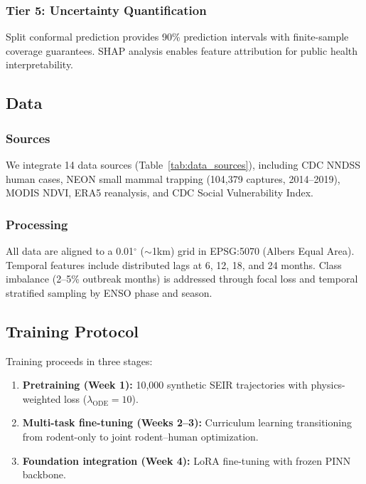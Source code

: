 \documentclass[11pt,a4paper]{article}
\begin{document}
\subsubsection{Tier 5: Uncertainty Quantification}

Split conformal prediction provides 90\% prediction intervals with finite-sample coverage guarantees. SHAP analysis enables feature attribution for public health interpretability.

\subsection{Data}

\subsubsection{Sources}

We integrate 14 data sources (Table~\ref{tab:data_sources}), including CDC NNDSS human cases, NEON small mammal trapping (104,379 captures, 2014--2019), MODIS NDVI, ERA5 reanalysis, and CDC Social Vulnerability Index.

\subsubsection{Processing}

All data are aligned to a 0.01$^\circ$ ($\sim$1km) grid in EPSG:5070 (Albers Equal Area). Temporal features include distributed lags at 6, 12, 18, and 24 months. Class imbalance (2--5\% outbreak months) is addressed through focal loss and temporal stratified sampling by ENSO phase and season.

\subsection{Training Protocol}

Training proceeds in three stages:
\begin{enumerate}
    \item \textbf{Pretraining (Week 1):} 10,000 synthetic SEIR trajectories with physics-weighted loss ($\lambda_{\text{ODE}} = 10$).
    \item \textbf{Multi-task fine-tuning (Weeks 2--3):} Curriculum learning transitioning from rodent-only to joint rodent--human optimization.
    \item \textbf{Foundation integration (Week 4):} LoRA fine-tuning with frozen PINN backbone.
\end{enumerate}
\end{document}
